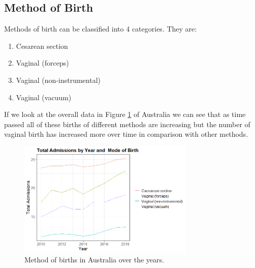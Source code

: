 \subsection{Method of Birth}
Methods of birth can be classified into 4 categories. They are:
\begin{enumerate}
    \item Cesarean section
    \item Vaginal (forceps)
    \item Vaginal (non-instrumental)
    \item Vaginal (vacuum)
\end{enumerate}
If we look at the overall data in Figure \ref{fig:method_au} of Australia we can see that as time passed all of these births of different methods are increasing but the number of vaginal birth has increased more over time in comparison with other methods.
\begin{figure}
  \centering
  \includegraphics[width=0.75\textwidth]{subsections/method_of_birth/method_of_birth_au.png}
  \caption{Method of births in Australia over the years.}
  \label{fig:method_au}
\end{figure}

